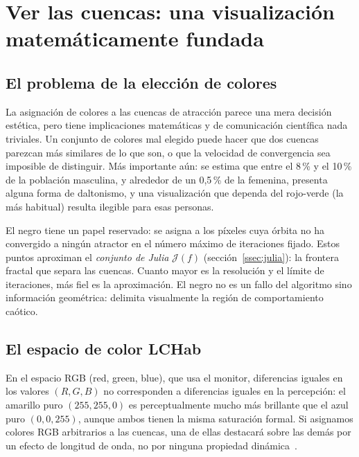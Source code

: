 \documentclass[11pt,a4paper]{article}
\theoremstyle{plain}
\theoremstyle{definition}
\theoremstyle{remark}
\begin{document}
\section{Ver las cuencas: una visualización matemáticamente fundada}
\label{sec:visualizacion}

\subsection{El problema de la elección de colores}

La asignación de colores a las cuencas de atracción parece una mera decisión
estética, pero tiene implicaciones matemáticas y de comunicación
científica nada triviales.
Un conjunto de colores mal elegido puede hacer que dos cuencas parezcan
más similares de lo que son, o que la velocidad de convergencia sea
imposible de distinguir.
Más importante aún: se estima que entre el 8\,\% y el 10\,\% de la
población masculina, y alrededor de un 0{,}5\,\% de la femenina,
presenta alguna forma de daltonismo, y una visualización que dependa
del rojo-verde (la más habitual) resulta ilegible para esas personas.

El negro tiene un papel reservado: se asigna a los píxeles cuya órbita
no ha convergido a ningún atractor en el número máximo de iteraciones
fijado.
Estos puntos aproximan el \emph{conjunto de Julia} $\mathcal{J}(f)$
(sección~\ref{ssec:julia}): la frontera fractal que separa las cuencas.
Cuanto mayor es la resolución y el límite de iteraciones, más fiel es la
aproximación.
El negro no es un fallo del algoritmo sino información geométrica:
delimita visualmente la región de comportamiento caótico.

\subsection{El espacio de color LCHab}

En el espacio RGB (red, green, blue), que usa el monitor, diferencias iguales en los
valores $(R,G,B)$ no corresponden a diferencias iguales en la percepción:
el amarillo puro $(255,255,0)$ es perceptualmente mucho más brillante
que el azul puro $(0,0,255)$, aunque ambos tienen la misma saturación
formal.
Si asignamos colores RGB arbitrarios a las cuencas, una de ellas
destacará sobre las demás por un efecto de longitud de onda, no por
ninguna propiedad dinámica~\cite{Zeileis2009}.
\end{document}
